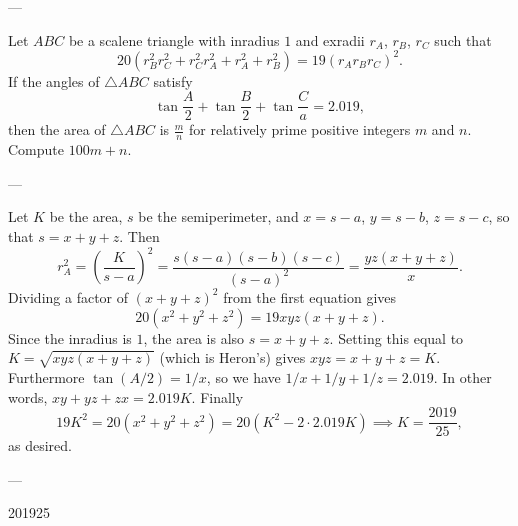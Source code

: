 
---

Let $ABC$ be a scalene triangle with inradius $1$ and exradii $r_A$, $r_B$, $r_C$ such that \[20\left(r_B^2r_C^2+r_C^2r_A^2+r_A^2+r_B^2\right)=19(r_Ar_Br_C)^2.\]
If the angles of $\triangle ABC$ satisfy \[\tan\frac A2+\tan\frac B2+\tan\frac Ca=2.019,\]
then the area of $\triangle ABC$ is $\tfrac mn$ for relatively prime positive integers $m$ and $n$. Compute $100m+n$.

---

Let $K$ be the area, $s$ be the semiperimeter, and $x=s-a$, $y=s-b$, $z=s-c$, so that $s=x+y+z$. Then \[r_A^2=\left(\frac K{s-a}\right)^2=\frac{s(s-a)(s-b)(s-c)}{(s-a)^2}=\frac{yz(x+y+z)}x.\]
Dividing a factor of $(x+y+z)^2$ from the first equation gives \[20(x^2+y^2+z^2)=19xyz(x+y+z).\]
Since the inradius is $1$, the area is also $s=x+y+z$. Setting this equal to $K=\sqrt{xyz(x+y+z)}$ (which is Heron's) gives $xyz=x+y+z=K$. Furthermore $\tan(A/2)=1/x$, so we have $1/x+1/y+1/z=2.019$. In other words, $xy+yz+zx=2.019K$. Finally \[19K^2=20(x^2+y^2+z^2)=20(K^2-2\cdot 2.019K)\implies K=\frac{2019}{25},\]
as desired.

---

201925
